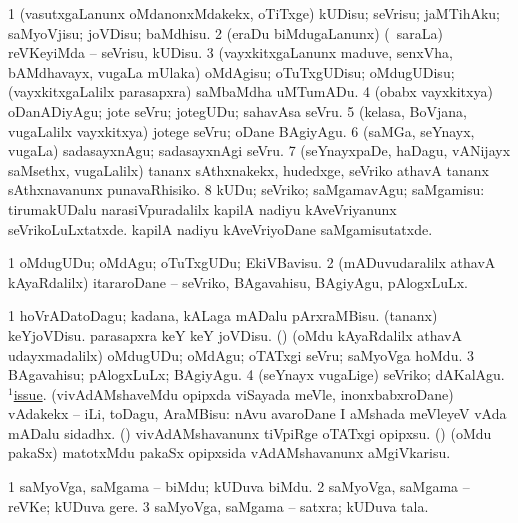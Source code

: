 \bentry
{}
\gl{\sakirx}
\bmng
\bnum
\num{1} (vasutxgaLanunx oMdanonxMdakekx, oTiTxge) kUDisu; seVrisu; jaMTihAku; saMyoVjisu; joVDisu; baMdhisu. 
\num{2} (eraDu biMdugaLanunx) (\kanmu\ saraLa) reVKeyiMda -- seVrisu, kUDisu. 
\num{3} (vayxkitxgaLanunx maduve, senxVha, bAMdhavayx, \mo vugaLa mUlaka) oMdAgisu; oTuTxgUDisu; oMdugUDisu; (vayxkitxgaLalilx parasapxra) saMbaMdha uMTumADu. 
\num{4} (obabx vayxkitxya) oDanADiyAgu; jote seVru; jotegUDu; sahavAsa seVru. 
\num{5} (kelasa, BoVjana, \mo vugaLalilx vayxkitxya) jotege seVru; oDane BAgiyAgu. 
\num{6} (saMGa, seYnayx, \mo vugaLa) sadasayxnAgu; sadasayxnAgi seVru. 
\num{7} (seYnayxpaDe, haDagu, vANijayx saMsethx, \mo vugaLalilx) tananx sAthxnakekx, hudedxge, seVriko athavA tananx sAthxnavanunx punavaRhisiko. 
\num{8} kUDu; seVriko; saMgamavAgu; saMgamisu:  tirumakUDalu narasiVpuradalilx kapilA nadiyu kAveVriyanunx seVrikoLuLxtatxde. kapilA nadiyu kAveVriyoDane saMgamisutatxde. 
\enum
\emng

\noindent
\gl{\akirx}
\bmng
\bnum
\num{1} oMdugUDu; oMdAgu; oTuTxgUDu; EkiVBavisu. 
\num{2} (mADuvudaralilx athavA kAyaRdalilx) itararoDane -- seVriko, BAgavahisu, BAgiyAgu, pAlogxLuLx. 
\enum
\emng

\noindent
\gl{\pagu}
\bmng
\bnum
\num{1}  hoVrADatoDagu; kadana, kALaga mADalu pArxraMBisu. 
  
\banum
{} (tananx) keYjoVDisu. 
 parasapxra keY keY joVDisu. 
 (\rUpa) (oMdu kAyaRdalilx athavA udayxmadalilx) oMdugUDu; oMdAgu; oTATxgi seVru; saMyoVga hoMdu. 
\eanum
\numie
\num{3}   BAgavahisu; pAlogxLuLx; BAgiyAgu. 
\num{4}   (seYnayx \mo vugaLige) seVriko; dAKalAgu. 
  \hyperref{kandict_i.pdf}{I}{issue(1) pagu(6)}{$^1$issue}. 
\banum
{} (vivAdAMshaveMdu opipxda viSayada meVle, inonxbabxroDane) vAdakekx -- iLi, toDagu, AraMBisu:  nAvu avaroDane I aMshada meVleyeV vAda mADalu sidadhx. 
 (\nAyxshA) vivAdAMshavanunx tiVpiRge oTATxgi opipxsu. 
 (\nAyxshA) (oMdu pakaSx) matotxMdu pakaSx opipxsida vAdAMshavanunx aMgiVkarisu. 
\eanum
\numie
\enum
\emng
\eentry

\bentry
{}
\gl{\nA}
\bmng
\bnum
\num{1} saMyoVga, saMgama -- biMdu; kUDuva biMdu. 
\num{2} saMyoVga, saMgama -- reVKe; kUDuva gere. 
\num{3} saMyoVga, saMgama -- satxra; kUDuva tala. 
\enum
\emng
\eentry


